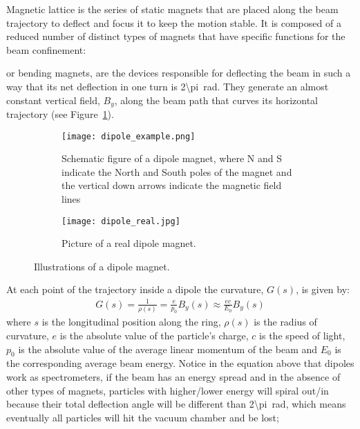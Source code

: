     Magnetic lattice is the series of static magnets that are placed along the beam trajectory to deflect and focus it to keep the motion stable. It is composed of a reduced number of distinct types of magnets that have specific functions for the beam confinement:
    \begin{description}[align=left]
        \item[Dipoles:] or bending magnets, are the devices responsible for deflecting the beam in such a way that its net deflection in one turn is \SI{2\pi}{\radian}. They generate an almost constant vertical field, $B_y$, along the beam path that curves its horizontal trajectory (see Figure~\ref{fig:dipole}).
        \begin{figure}
            \centering
            \begin{subfigure}[c]{0.45\textwidth}
                \texttt{[image: dipole\_example.png]}
                \caption{Schematic figure of a dipole magnet, where N and S indicate the North and South poles of the magnet and the vertical down arrows indicate the magnetic field lines}
            \end{subfigure}\hfill
            \begin{subfigure}[c]{0.5\textwidth}
                \texttt{[image: dipole\_real.jpg]}
                \caption{Picture of a real dipole magnet.}
            \end{subfigure}
            \caption{Illustrations of a dipole magnet.}
            \label{fig:dipole}
        \end{figure}
        At each point of the trajectory inside a dipole the curvature, $G(s)$, is given by:
        \begin{align}\label{eq:curvature_dipole}
            G(s) = \frac{1}{\rho(s)} = \frac{e}{p_0}B_y(s) \approx \frac{ec}{E_0}B_y(s)
        \end{align}
        where $s$ is the longitudinal position along the ring, $\rho(s)$ is the radius of curvature, $e$ is the absolute value of the particle's charge, $c$ is the speed of light, $p_0$ is the absolute value of the average linear momentum of the beam and $E_0$ is the corresponding average beam energy. Notice in the equation above that dipoles work as spectrometers, if the beam has an energy spread and in the absence of other types of magnets, particles with higher/lower energy will spiral out/in because their total deflection angle will be different than \SI{2\pi}{\radian}, which means eventually all particles will hit the vacuum chamber and be lost;

\end{description}
